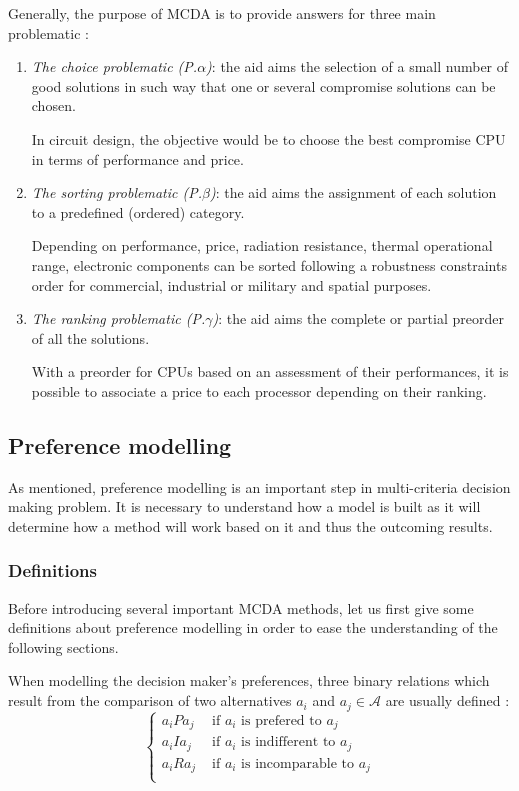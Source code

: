 Generally, the purpose of MCDA is to provide answers for three main problematic \cite{EhrgottFigueiraGreco2005}:
\begin{enumerate}
\item \textit{The choice problematic (P.$\alpha$)}: the aid aims the selection of a small number of good solutions in such way that one or several compromise solutions can be chosen.
\begin{example}
In circuit design, the objective would be to choose the best compromise CPU in terms of performance and price.
\end{example}
\item \textit{The sorting problematic (P.$\beta$)}: the aid aims the assignment of each solution to a predefined (ordered) category.
\begin{example}
Depending on performance, price, radiation resistance, thermal operational range, electronic components can be sorted following a robustness constraints order for commercial, industrial or military and spatial purposes.
\end{example}
\item \textit{The ranking problematic (P.$\gamma$)}: the aid aims the complete or partial preorder of all the solutions.
\begin{example}
With a preorder for CPUs based on an assessment of their performances, it is possible to associate a price to each processor depending on their ranking.
\end{example}
\end{enumerate}

\subsection{Preference modelling}
\label{sec:prefmod}
As mentioned, preference modelling is an important step in multi-criteria decision making problem. It is necessary to understand how a model is built as it will determine how a method will work based on it and thus the outcoming results.

\subsubsection{Definitions}
Before introducing several important MCDA methods, let us first give some definitions about preference modelling in order to ease the understanding of the following sections.

When modelling the decision maker's preferences, three binary relations which result from the comparison of two alternatives $a_i$ and $a_j \in \mathcal{A}$ are usually defined \cite{Vin92}:
\begin{equation}
\left\{
\begin{array}{ll}
a_iPa_j & \text{ if $a_i$ is prefered to $a_j$}\\
a_iIa_j & \text{ if $a_i$ is indifferent to $a_j$}\\
a_iRa_j & \text{ if $a_i$ is incomparable to $a_j$}\\
\end{array}
\right.
\end{equation}

